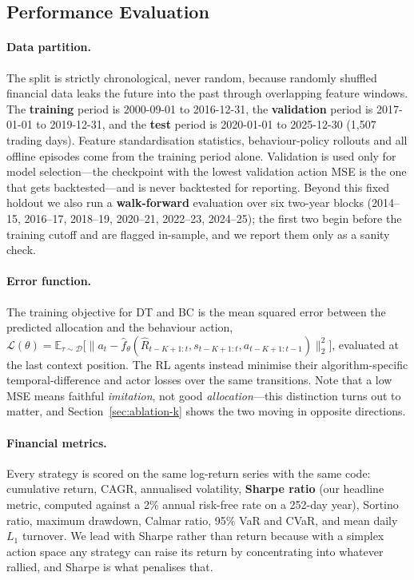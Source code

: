 \documentclass[11pt]{article}
\begin{document}
\subsection{Performance Evaluation}
\label{sec:eval}

\paragraph{Data partition.}
The split is strictly chronological, never random, because randomly shuffled financial data
leaks the future into the past through overlapping feature windows. The
\textbf{training} period is 2000-09-01 to 2016-12-31, the \textbf{validation} period is
2017-01-01 to 2019-12-31, and the \textbf{test} period is 2020-01-01 to 2025-12-30
(1{,}507 trading days). Feature standardisation statistics, behaviour-policy rollouts and all
offline episodes come from the training period alone. Validation is used only for model
selection---the checkpoint with the lowest validation action MSE is the one that gets
backtested---and is never backtested for reporting. Beyond this fixed holdout we also run a
\textbf{walk-forward} evaluation over six two-year blocks (2014--15, 2016--17, 2018--19,
2020--21, 2022--23, 2024--25); the first two begin before the training cutoff and are flagged
in-sample, and we report them only as a sanity check.

\paragraph{Error function.}
The training objective for DT and BC is the mean squared error between the predicted allocation
and the behaviour action,
$\mathcal{L}(\theta) = \mathbb{E}_{\tau \sim \mathcal{D}}\big[\lVert a_t - \hat{f}_\theta(\hat{R}_{t-K+1:t}, s_{t-K+1:t}, a_{t-K+1:t-1})\rVert_2^2\big]$,
evaluated at the last context position. The RL agents instead minimise their algorithm-specific
temporal-difference and actor losses over the same transitions. Note that a low MSE means
faithful \emph{imitation}, not good \emph{allocation}---this distinction turns out to matter,
and Section~\ref{sec:ablation-k} shows the two moving in opposite directions.

\paragraph{Financial metrics.}
Every strategy is scored on the same log-return series with the same code: cumulative return,
CAGR, annualised volatility, \textbf{Sharpe ratio} \cite{sharpe1994sharpe} (our headline
metric, computed against a 2\% annual risk-free rate on a 252-day year), Sortino ratio,
maximum drawdown, Calmar ratio, 95\% VaR and CVaR, and mean daily $L_1$ turnover. We lead with
Sharpe rather than return because with a simplex action space any strategy can raise its return
by concentrating into whatever rallied, and Sharpe is what penalises that.
\end{document}
